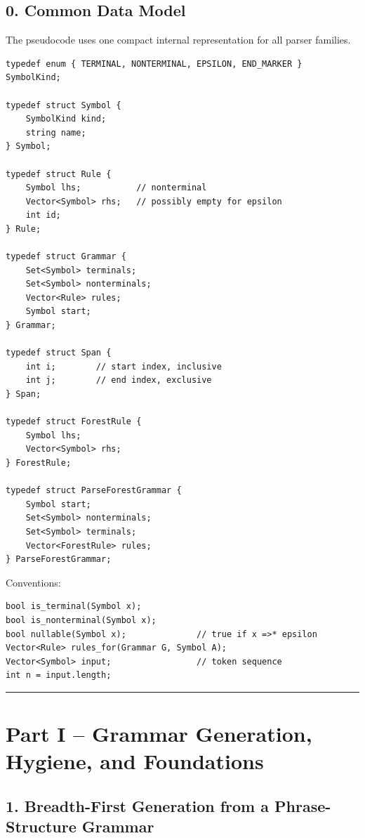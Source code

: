 \documentclass[10pt,letterpaper]{article}
\begin{document}
\subsection*{0. Common Data Model}

The pseudocode uses one compact internal representation for all parser families.

\begin{verbatim}
typedef enum { TERMINAL, NONTERMINAL, EPSILON, END_MARKER } SymbolKind;

typedef struct Symbol {
    SymbolKind kind;
    string name;
} Symbol;

typedef struct Rule {
    Symbol lhs;           // nonterminal
    Vector<Symbol> rhs;   // possibly empty for epsilon
    int id;
} Rule;

typedef struct Grammar {
    Set<Symbol> terminals;
    Set<Symbol> nonterminals;
    Vector<Rule> rules;
    Symbol start;
} Grammar;

typedef struct Span {
    int i;        // start index, inclusive
    int j;        // end index, exclusive
} Span;

typedef struct ForestRule {
    Symbol lhs;
    Vector<Symbol> rhs;
} ForestRule;

typedef struct ParseForestGrammar {
    Symbol start;
    Set<Symbol> nonterminals;
    Set<Symbol> terminals;
    Vector<ForestRule> rules;
} ParseForestGrammar;
\end{verbatim}

Conventions:

\begin{verbatim}
bool is_terminal(Symbol x);
bool is_nonterminal(Symbol x);
bool nullable(Symbol x);              // true if x =>* epsilon
Vector<Rule> rules_for(Grammar G, Symbol A);
Vector<Symbol> input;                 // token sequence
int n = input.length;
\end{verbatim}

\medskip\hrule\medskip

\clearpage
\section*{Part I -- Grammar Generation, Hygiene, and Foundations}

\subsection*{1. Breadth-First Generation from a Phrase-Structure Grammar}
\end{document}
